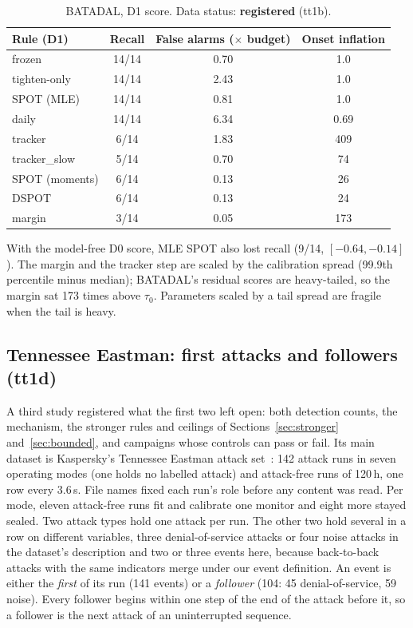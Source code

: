 \documentclass[sigconf,review,anonymous]{acmart}
\begin{document}
\begin{table}[t]
\caption{BATADAL, D1 score. Data status: \textbf{registered} (tt1b).}
\label{tab:batadal}
\begin{tabularx}{\columnwidth}{@{}lCCC@{}}
\toprule
Rule (D1) & Recall & False alarms ($\times$ budget) & Onset inflation \\
\midrule
frozen & 14/14 & 0.70 & 1.0 \\
tighten-only & 14/14 & 2.43 & 1.0 \\
SPOT (MLE) & 14/14 & 0.81 & 1.0 \\
daily & 14/14 & 6.34 & 0.69 \\
tracker & 6/14 & 1.83 & 409 \\
tracker\_slow & 5/14 & 0.70 & 74 \\
SPOT (moments) & 6/14 & 0.13 & 26 \\
DSPOT & 6/14 & 0.13 & 24 \\
margin & 3/14 & 0.05 & 173 \\
\bottomrule
\end{tabularx}
\end{table}

With the model-free D0 score, MLE SPOT also lost recall (9/14, $[-0.64, -0.14]$). The margin and the
tracker step are scaled by the calibration spread (99.9th percentile minus median); BATADAL's
residual scores are heavy-tailed, so the margin sat 173 times above $\tau_0$. Parameters scaled by a
tail spread are fragile when the tail is heavy.


\subsection{Tennessee Eastman: first attacks and followers (tt1d)}
\label{sec:tep}

A third study registered what the first two left open: both detection counts, the mechanism, the
stronger rules and ceilings of Sections~\ref{sec:stronger} and~\ref{sec:bounded}, and campaigns whose
controls can pass or fail. Its main dataset is Kaspersky's Tennessee Eastman attack
set~\cite{filonov2017tep, downs1993tep}: 142 attack runs in seven operating modes (one holds no
labelled attack) and attack-free runs of 120\,h, one row every 3.6\,s. File names fixed each run's role
before any content was read. Per mode, eleven attack-free runs fit and calibrate one monitor and eight
more stayed sealed. Two attack types hold one attack per run. The other two hold several in a row on
different variables, three denial-of-service attacks or four noise attacks in the dataset's
description and two or three events here, because back-to-back attacks with the same indicators merge
under our event definition. An event is either the \emph{first} of its run (141 events) or a
\emph{follower} (104: 45 denial-of-service, 59 noise). Every follower begins within one step of the end
of the attack before it, so a follower is the next attack of an uninterrupted sequence.
\end{document}
